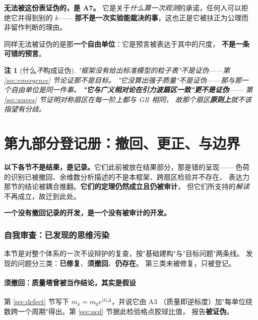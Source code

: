 \documentclass[11pt,a4paper]{article}
\theoremstyle{sudef}
\newtheorem{remark}[theorem]{注}
\begin{document}
\begin{mdframed}[linecolor=red!60!black,linewidth=1.2pt,backgroundcolor=red!4]
\textbf{无法被这份表证伪的，是 A7。}
它是关于\emph{什么算一次观测}的承诺，任何人可以拒绝它并得到别的 $k$——
\textbf{那不是一次实验能裁决的事}，这也正是它被扶正为公理而非留作判断的理由。

同样无法被证伪的是那\textbf{一个自由单位}：它是预言被表达于其中的尺度，
\textbf{不是一条可错的预言}。
\end{mdframed}

\begin{remark}[什么\emph{不}构成证伪]
"框架没有给出标准模型的粒子表"不是证伪——第 \ref{sec:emergence} 节论证那不是目标。
"它没算出强子质量"不是证伪——那与那一个自由单位是同一件事。
\textbf{"它与广义相对论在引力波扇区一致"更不是证伪}——
第 \ref{sec:waves} 节证明对称扇区在\emph{每一阶}上都与 GR 相同，
故那个扇区\textbf{原则上}就不该指望有分歧。
\end{remark}

\clearpage
\part{第九部分\quad 登记册：撤回、更正、与边界}

\noindent
\textbf{以下各节不是结果，是记录。}它们此前被放在结果部分，那是错的呈现——
色荷的识别已被撤回、余维数分析描述的不是本框架、跨扇区检验并不存在、
表达力那节的结论被耦合推翻。\textbf{它们的定理仍然成立且仍被审计}，
但它们所支持的\emph{解读}不再成立，故迁到此处。

\textbf{一个没有撤回记录的开发，是一个没有被审计的开发。}

\section{自我审查：已发现的思维污染}\label{sec:audit}

本节是对整个体系的一次不设辩护的复查，按"基础建构"与"目标问题"两条线。
发现的问题分三类：\textbf{已修复}、\textbf{须撤回}、\textbf{仍存在}。
第三类未被修复，只被登记。

\subsection{须撤回：质量塔曾被当作结论，其实是假设}

第 \ref{sec:defect} 节写下 $m_k=m_0e^{|k|\Delta}$，并说它由 A3
（质量即逆标度）加"每单位绕数跨一个周期"得出。第 \ref{sec:qcd} 节据此检验格点胶球比值，
报告\textbf{被证伪}。
\end{document}
